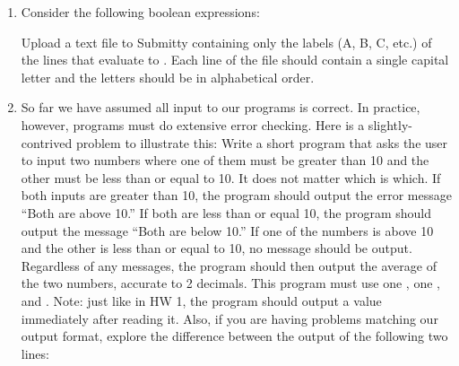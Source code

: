 \documentclass[letterpaper,10pt,english]{sphinxmanual}
\begin{document}
\begin{enumerate}
\item {} 
Consider the following boolean expressions:

\begin{sphinxVerbatim}[commandchars=\\\{\}]
  
  
  
              
               
         
          
            
            
\end{sphinxVerbatim}

Upload a text file to Submitty containing only the labels (A, B, C,
etc.) of the lines that evaluate to .  Each line of the
file should contain a single capital letter and the letters should
be in alphabetical order.

\item {} 
So far we have assumed all input to our programs is correct.  In
practice, however, programs must do extensive error checking.  Here
is a slightly-contrived problem to illustrate this: Write a short
program that asks the user to input two numbers where one of them
must be greater than 10 and the other must be less than or equal
to 10.  It does not matter which is which.  If both inputs are
greater than 10, the program should output the error message “Both
are above 10.”  If both are less than or equal 10, the program
should output the message “Both are below 10.”  If one of the
numbers is above 10 and the other is less than or equal to 10, no message
should be output.  Regardless of any messages, the program should then
output the average of
the two numbers, accurate to 2 decimals.  This program must use one
, one , and  .  Note: just like in HW 1, the
program should output a value immediately after reading it. Also, if you
are having problems matching our output format, explore the difference
between the output of the following two lines:


\end{enumerate}
\end{document}
